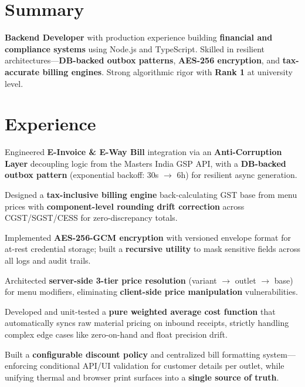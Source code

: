 \documentclass[]{deedy-resume-openfont}
\renewcommand{\sectionsep}{\vspace{8pt}}
\begin{document}
\hfill
\begin{minipage}[t]{0.66\textwidth}


\section{Summary}
\textbf{Backend Developer} with production experience building \textbf{financial and compliance systems} using Node.js and TypeScript. Skilled in resilient architectures—\textbf{DB-backed outbox patterns}, \textbf{AES-256 encryption}, and \textbf{tax-accurate billing engines}. Strong algorithmic rigor with \textbf{Rank 1} at university level.
\sectionsep


\section{Experience}
\vspace{4pt}
\begin{tightemize}
  \item Engineered \textbf{E-Invoice \& E-Way Bill} integration via an \textbf{Anti-Corruption Layer} decoupling logic from the Masters India GSP API, with a \textbf{DB-backed outbox pattern} (exponential backoff: 30s $\rightarrow$ 6h) for resilient async generation.
  \item Designed a \textbf{tax-inclusive billing engine} back-calculating GST base from menu prices with \textbf{component-level rounding drift correction} across CGST/SGST/CESS for zero-discrepancy totals.
  \item Implemented \textbf{AES-256-GCM encryption} with versioned envelope format for at-rest credential storage; built a \textbf{recursive utility} to mask sensitive fields across all logs and audit trails.
  \item Architected \textbf{server-side 3-tier price resolution} (variant $\rightarrow$ outlet $\rightarrow$ base) for menu modifiers, eliminating \textbf{client-side price manipulation} vulnerabilities.
  \item Developed and unit-tested a \textbf{pure weighted average cost function} that automatically syncs raw material pricing on inbound receipts, strictly handling complex edge cases like zero-on-hand and float precision drift.
    \item Built a \textbf{configurable discount policy} and centralized bill formatting system---enforcing conditional API/UI validation for customer details per outlet, while unifying thermal and browser print surfaces into a \textbf{single source of truth}.


\end{tightemize}
\end{minipage}
\end{document}
